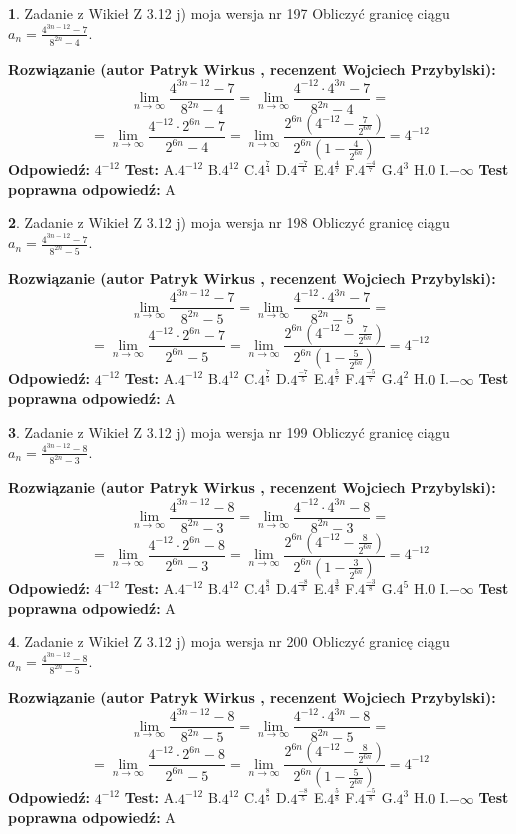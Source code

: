 \documentclass[12pt, a4paper]{article}
\theoremstyle{definition} %
\newtheorem{zad}{}
\newcommand{\zadStart}[1]{\begin{zad}#1\newline}
\newcommand{\zadStop}{\end{zad}}
\newcommand{\rozwStart}[2]{\noindent \textbf{Rozwiązanie (autor #1 , recenzent #2): }\newline}
\newcommand{\rozwStop}{\newline}
\newcommand{\odpStart}{\noindent \textbf{Odpowiedź:}\newline}
\newcommand{\odpStop}{\newline}
\newcommand{\testStart}{\noindent \textbf{Test:}\newline}
\newcommand{\testStop}{\newline}
\newcommand{\kluczStart}{\noindent \textbf{Test poprawna odpowiedź:}\newline}
\newcommand{\kluczStop}{\newline}
\begin{document}
\zadStart{Zadanie z Wikieł Z 3.12 j) moja wersja nr 197}
Obliczyć granicę ciągu $a_{n}=\frac{4^{3n-12}-7}{8^{2n}-4}$.
\zadStop
\rozwStart{Patryk Wirkus}{Wojciech Przybylski}
$$\lim\limits_{n\to\infty}\frac{4^{3n-12}-7}{8^{2n}-4}= \lim\limits_{n\to\infty}\frac{4^{-12} \cdot 4^{3n}-7}{8^{2n}-4}=$$
$$= \lim\limits_{n\to\infty}\frac{4^{-12} \cdot 2^{6n}-7}{2^{6n}-4}= \lim\limits_{n\to\infty}\frac{2^{6n}(4^{-12} - \frac{7}{2^{6n}})}{2^{6n}(1-\frac{4}{2^{6n}})}= 4^{-12}$$
\rozwStop
\odpStart
$4^{-12}$
\odpStop
\testStart
A.$4^{-12}$
B.$4^{12}$
C.$4^{\frac{7}{4}}$
D.$4^{\frac{-7}{4}}$
E.$4^{\frac{4}{7}}$
F.$4^{\frac{-4}{7}}$
G.$4^{3}$
H.$0$
I.$-\infty$
\testStop
\kluczStart
A
\kluczStop



\zadStart{Zadanie z Wikieł Z 3.12 j) moja wersja nr 198}
Obliczyć granicę ciągu $a_{n}=\frac{4^{3n-12}-7}{8^{2n}-5}$.
\zadStop
\rozwStart{Patryk Wirkus}{Wojciech Przybylski}
$$\lim\limits_{n\to\infty}\frac{4^{3n-12}-7}{8^{2n}-5}= \lim\limits_{n\to\infty}\frac{4^{-12} \cdot 4^{3n}-7}{8^{2n}-5}=$$
$$= \lim\limits_{n\to\infty}\frac{4^{-12} \cdot 2^{6n}-7}{2^{6n}-5}= \lim\limits_{n\to\infty}\frac{2^{6n}(4^{-12} - \frac{7}{2^{6n}})}{2^{6n}(1-\frac{5}{2^{6n}})}= 4^{-12}$$
\rozwStop
\odpStart
$4^{-12}$
\odpStop
\testStart
A.$4^{-12}$
B.$4^{12}$
C.$4^{\frac{7}{5}}$
D.$4^{\frac{-7}{5}}$
E.$4^{\frac{5}{7}}$
F.$4^{\frac{-5}{7}}$
G.$4^{2}$
H.$0$
I.$-\infty$
\testStop
\kluczStart
A
\kluczStop



\zadStart{Zadanie z Wikieł Z 3.12 j) moja wersja nr 199}
Obliczyć granicę ciągu $a_{n}=\frac{4^{3n-12}-8}{8^{2n}-3}$.
\zadStop
\rozwStart{Patryk Wirkus}{Wojciech Przybylski}
$$\lim\limits_{n\to\infty}\frac{4^{3n-12}-8}{8^{2n}-3}= \lim\limits_{n\to\infty}\frac{4^{-12} \cdot 4^{3n}-8}{8^{2n}-3}=$$
$$= \lim\limits_{n\to\infty}\frac{4^{-12} \cdot 2^{6n}-8}{2^{6n}-3}= \lim\limits_{n\to\infty}\frac{2^{6n}(4^{-12} - \frac{8}{2^{6n}})}{2^{6n}(1-\frac{3}{2^{6n}})}= 4^{-12}$$
\rozwStop
\odpStart
$4^{-12}$
\odpStop
\testStart
A.$4^{-12}$
B.$4^{12}$
C.$4^{\frac{8}{3}}$
D.$4^{\frac{-8}{3}}$
E.$4^{\frac{3}{8}}$
F.$4^{\frac{-3}{8}}$
G.$4^{5}$
H.$0$
I.$-\infty$
\testStop
\kluczStart
A
\kluczStop



\zadStart{Zadanie z Wikieł Z 3.12 j) moja wersja nr 200}
Obliczyć granicę ciągu $a_{n}=\frac{4^{3n-12}-8}{8^{2n}-5}$.
\zadStop
\rozwStart{Patryk Wirkus}{Wojciech Przybylski}
$$\lim\limits_{n\to\infty}\frac{4^{3n-12}-8}{8^{2n}-5}= \lim\limits_{n\to\infty}\frac{4^{-12} \cdot 4^{3n}-8}{8^{2n}-5}=$$
$$= \lim\limits_{n\to\infty}\frac{4^{-12} \cdot 2^{6n}-8}{2^{6n}-5}= \lim\limits_{n\to\infty}\frac{2^{6n}(4^{-12} - \frac{8}{2^{6n}})}{2^{6n}(1-\frac{5}{2^{6n}})}= 4^{-12}$$
\rozwStop
\odpStart
$4^{-12}$
\odpStop
\testStart
A.$4^{-12}$
B.$4^{12}$
C.$4^{\frac{8}{5}}$
D.$4^{\frac{-8}{5}}$
E.$4^{\frac{5}{8}}$
F.$4^{\frac{-5}{8}}$
G.$4^{3}$
H.$0$
I.$-\infty$
\testStop
\kluczStart
A
\kluczStop
\end{document}
